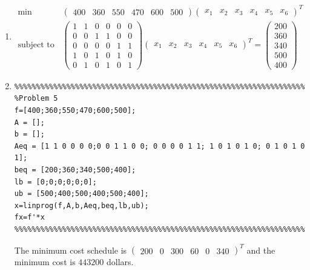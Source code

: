 \documentclass[12pt]{article}
\begin{document}
\begin{problem}[5]
\begin{enumerate}[label=(\arabic*)]
	\item \begin{align*}
	\min\quad & \begin{pmatrix} 400&360&550&470&600&500 \end{pmatrix} \begin{pmatrix} x_1&x_2&x_3&x_4&x_5&x_6 \end{pmatrix}^{T}  \\
	\text{subject to } \quad & \begin{pmatrix} 1&1&0&0&0&0\\0&0&1&1&0&0\\0&0&0&0&1&1\\1&0&1&0&1&0\\0&1&0&1&0&1 \end{pmatrix} \begin{pmatrix} x_1&x_2&x_3&x_4&x_5&x_6 \end{pmatrix}^{T}  = \begin{pmatrix} 200\\360\\340\\500\\400 \end{pmatrix} 
\end{align*}
\item 
\begin{lstlisting}
%%%%%%%%%%%%%%%%%%%%%%%%%%%%%%%%%%%%%%%%%%%%%%%%%%%%%%%%%%%%%%%%%%%%%%%%%%
%Problem 5
f=[400;360;550;470;600;500];
A = [];
b = [];
Aeq = [1 1 0 0 0 0;0 0 1 1 0 0; 0 0 0 0 1 1; 1 0 1 0 1 0; 0 1 0 1 0 1];
beq = [200;360;340;500;400];
lb = [0;0;0;0;0;0];
ub = [500;400;500;400;500;400];
x=linprog(f,A,b,Aeq,beq,lb,ub);
fx=f'*x
%%%%%%%%%%%%%%%%%%%%%%%%%%%%%%%%%%%%%%%%%%%%%%%%%%%%%%%%%%%%%%%%%%%%%%%%%%
\end{lstlisting}

The minimum cost schedule is $ \begin{pmatrix} 200&0&300&60&0&340 \end{pmatrix}^T $ and the minimum cost is $ 443200$ dollars.

\end{enumerate}
\end{problem}
\end{document}
